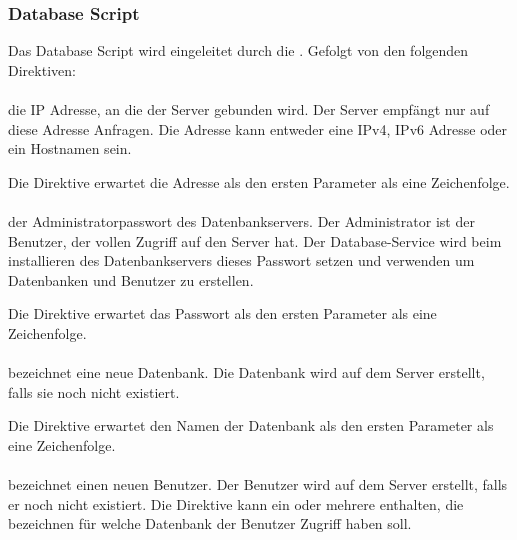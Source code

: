 \subsubsection{Database Script}

Das Database Script wird eingeleitet durch die . Gefolgt von
den folgenden Direktiven:

\paragraph{}

die IP Adresse, an die der Server gebunden wird. Der Server empfängt nur auf diese
Adresse Anfragen. Die Adresse kann entweder eine IPv4, IPv6 Adresse oder
ein Hostnamen sein.

Die Direktive erwartet die Adresse als den ersten Parameter als eine Zeichenfolge.

\paragraph{}

der Administratorpasswort des Datenbankservers. Der Administrator ist der Benutzer,
der vollen Zugriff auf den Server hat. Der Database-Service wird beim installieren
des Datenbankservers dieses Passwort setzen und verwenden um Datenbanken und Benutzer
zu erstellen.

Die Direktive erwartet das Passwort als den ersten Parameter als eine Zeichenfolge.

\paragraph{}

bezeichnet eine neue Datenbank. Die Datenbank wird auf dem Server erstellt, falls
sie noch nicht existiert.

Die Direktive erwartet den Namen der Datenbank als den ersten Parameter als eine Zeichenfolge.

\paragraph{}

bezeichnet einen neuen Benutzer. Der Benutzer wird auf dem Server erstellt, falls er
noch nicht existiert. Die Direktive kann ein oder mehrere 
enthalten, die bezeichnen für welche Datenbank der Benutzer Zugriff haben soll.

